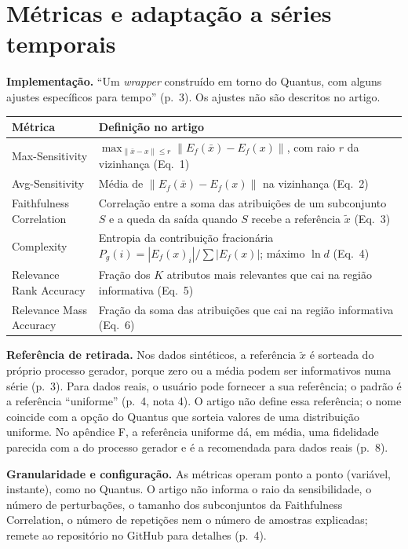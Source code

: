 \documentclass[11pt,a4paper]{article}
\begin{document}
\section{Métricas e adaptação a séries temporais}
\textbf{Implementação.} ``Um \textit{wrapper} construído em torno do Quantus, com alguns ajustes específicos para tempo'' (p.~3). Os ajustes não são descritos no artigo.
\begin{center}\small
\begin{tabularx}{\linewidth}{lX}
\toprule
\textbf{Métrica} & \textbf{Definição no artigo} \\
\midrule
Max-Sensitivity & $\max_{\|\bar{x} - x\| \le r} \|E_f(\bar{x}) - E_f(x)\|$, com raio $r$ da vizinhança (Eq.~1) \\
Avg-Sensitivity & Média de $\|E_f(\bar{x}) - E_f(x)\|$ na vizinhança (Eq.~2) \\
Faithfulness Correlation & Correlação entre a soma das atribuições de um subconjunto $S$ e a queda da saída quando $S$ recebe a referência $\tilde{x}$ (Eq.~3) \\
Complexity & Entropia da contribuição fracionária $P_g(i) = |E_f(x)_i| / \sum |E_f(x)|$; máximo $\ln d$ (Eq.~4) \\
Relevance Rank Accuracy & Fração dos $K$ atributos mais relevantes que cai na região informativa (Eq.~5) \\
Relevance Mass Accuracy & Fração da soma das atribuições que cai na região informativa (Eq.~6) \\
\bottomrule
\end{tabularx}
\end{center}
\textbf{Referência de retirada.} Nos dados sintéticos, a referência $\tilde{x}$ é sorteada do próprio processo gerador, porque zero ou a média podem ser informativos numa série (p.~3). Para dados reais, o usuário pode fornecer a sua referência; o padrão é a referência ``uniforme'' (p.~4, nota 4). O artigo não define essa referência; o nome coincide com a opção do Quantus que sorteia valores de uma distribuição uniforme. No apêndice F, a referência uniforme dá, em média, uma fidelidade parecida com a do processo gerador e é a recomendada para dados reais (p.~8).

\textbf{Granularidade e configuração.} As métricas operam ponto a ponto (variável, instante), como no Quantus. O artigo não informa o raio da sensibilidade, o número de perturbações, o tamanho dos subconjuntos da Faithfulness Correlation, o número de repetições nem o número de amostras explicadas; remete ao repositório no GitHub para detalhes (p.~4).
\end{document}
